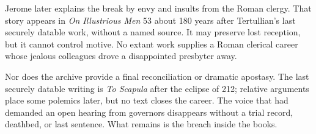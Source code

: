 Jerome later explains the break by envy and insults from the Roman clergy. That
story appears in \emph{On Illustrious Men} 53 about 180 years after Tertullian's
last securely datable work, without a named source. It may preserve lost
reception, but it cannot control motive. No extant work supplies a Roman
clerical career whose jealous colleagues drove a disappointed presbyter away.

Nor does the archive provide a final reconciliation or dramatic apostasy. The
last securely datable writing is \emph{To Scapula} after the eclipse of 212;
relative arguments place some polemics later, but no text closes the career.
The voice that had demanded an open hearing from governors disappears without
a trial record, deathbed, or last sentence. What remains is the breach inside
the books.
